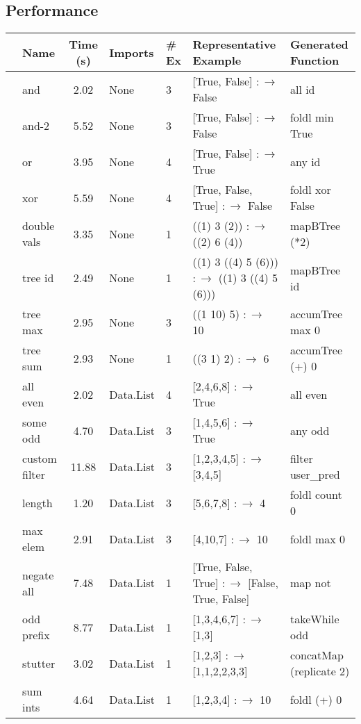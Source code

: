 \subsection{Performance}

\begin{table*}[t]
  \centering
  \bgroup
  \def\arraystretch{1.1}
  \begin{tabular}{|c|l|c|l|l|l|l|}
    \hline
    & Name & Time (s) & Imports & \# Ex & Representative Example & Generated Function \\
    \hline
    \parbox[t]{2mm}{}
    & and & 2.02 & None & 3 & [True, False] $:\to$ False & all id \\
    & and-2 & 5.52 & None & 3 & [True, False] $:\to$ False & foldl min True \\
    & or  & 3.95 & None & 4 & [True, False] $:\to$ True & any id \\
    & xor & 5.59 & None & 4 & [True, False, True] $:\to$ False & foldl xor False \\
    \hline

    \parbox[t]{2mm}{}
    & double vals & 3.35 & None & 1 & ((1) 3 (2)) $:\to$ ((2) 6 (4)) & mapBTree (*2) \\
    & tree id & 2.49 & None & 1 & ((1) 3 ((4) 5 (6))) $:\to$ ((1) 3 ((4) 5 (6))) & mapBTree id \\
    & tree max & 2.95 & None & 3 & ((1 10) 5) $:\to$ 10 & accumTree max 0 \\
    & tree sum & 2.93 & None & 1 & ((3 1) 2) $:\to$ 6 & accumTree (+) 0 \\
    \hline

    \parbox[t]{2mm}{}
    & all even & 2.02 & Data.List & 4 & [2,4,6,8] $:\to$ True & all even \\
    & some odd & 4.70 & Data.List & 3 & [1,4,5,6] $:\to$ True & any odd \\
    & custom filter & 11.88 & Data.List & 3 & [1,2,3,4,5] $:\to$ [3,4,5] & filter user\_pred \\
    & length & 1.20 & Data.List & 3 & [5,6,7,8] $:\to$ 4 & foldl count 0 \\
    & max elem & 2.91 & Data.List & 3 & [4,10,7] $:\to$ 10 & foldl max 0 \\
    & negate all & 7.48 & Data.List & 1 & [True, False, True] $:\to$ [False, True, False] & map not \\
    & odd prefix & 8.77 & Data.List & 1 & [1,3,4,6,7] $:\to$ [1,3] & takeWhile odd \\
    & stutter & 3.02 & Data.List & 1 & [1,2,3] $:\to$ [1,1,2,2,3,3] & concatMap (replicate 2) \\
    & sum ints & 4.64 & Data.List & 1 & [1,2,3,4] $:\to$ 10 & foldl (+) 0 \\
    \hline


\end{tabular}
\end{table*}
